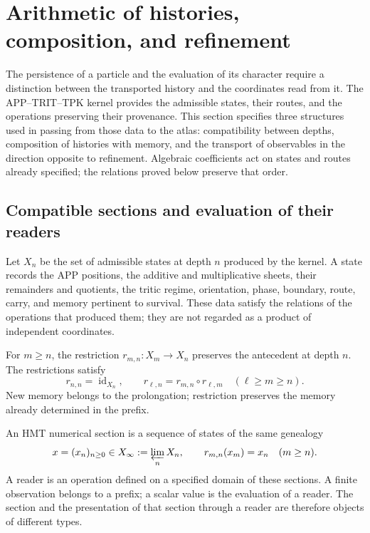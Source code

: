 \section{Arithmetic of histories, composition, and refinement}
\label{vi:hist:seccion-principal}

The persistence of a particle and the evaluation of its character require
a distinction between the transported history and the coordinates read from it.
The APP--TRIT--TPK kernel provides the admissible states, their routes, and
the operations preserving their provenance. This section specifies three
structures used in passing from those data to the atlas: compatibility
between depths, composition of histories with memory, and the
transport of observables in the direction opposite to refinement.
Algebraic coefficients act on states and routes already specified;
the relations proved below preserve that order.

\subsection{Compatible sections and evaluation of their readers}
\label{hist:seccion}

Let \(X_n\) be the set of admissible states at depth \(n\)
produced by the kernel. A state records the APP positions, the
additive and multiplicative sheets, their remainders and quotients, the tritic
regime, orientation, phase, boundary, route, carry, and
memory pertinent to survival. These data satisfy the
relations of the operations that produced them; they are not regarded as a
product of independent coordinates.

For \(m\ge n\), the restriction
\(r_{m,n}:X_m\longrightarrow X_n\) preserves the antecedent at depth
\(n\). The restrictions satisfy
\begin{equation}
 r_{n,n}=\operatorname{id}_{X_n},\qquad
 r_{\ell,n}=r_{m,n}\circ r_{\ell,m}
 \quad(\ell\ge m\ge n).
 \label{vi:hist:restricciones}
\end{equation}
New memory belongs to the prolongation; restriction preserves the memory
already determined in the prefix.

\begin{definition}
An HMT numerical section is a sequence of states of the same genealogy
\begin{equation}
 x=(x_n)_{n\ge0}\in X_\infty:=\varprojlim_n X_n,
 \qquad r_{m,n}(x_m)=x_n\quad(m\ge n).
 \label{vi:hist:limite-inverso}
\end{equation}
A reader is an operation defined on a specified domain of these
sections. A finite observation belongs to a prefix; a scalar value
is the evaluation of a reader. The section and the presentation of that section
through a reader are therefore objects of different types.
\end{definition}

